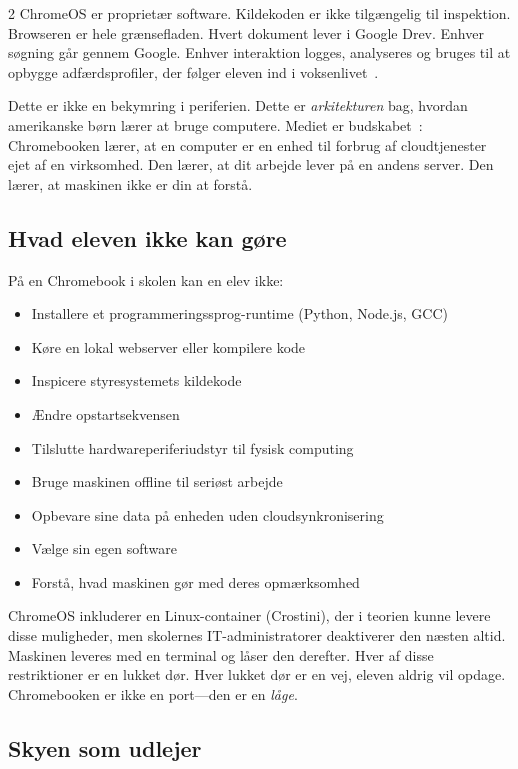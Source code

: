 \documentclass[11pt, a4paper]{article}
\begin{document}
\begin{multicols}{2}
ChromeOS er proprietær software. Kildekoden er ikke tilgængelig til inspektion. Browseren er hele grænsefladen. Hvert dokument lever i Google Drev. Enhver søgning går gennem Google. Enhver interaktion logges, analyseres og bruges til at opbygge adfærdsprofiler, der følger eleven ind i voksenlivet~\citep{zuboff2019surveillance}.

Dette er ikke en bekymring i periferien. Dette er \emph{arkitekturen} bag, hvordan amerikanske børn lærer at bruge computere. Mediet er budskabet~\citep{mcluhan1964understanding}: Chromebooken lærer, at en computer er en enhed til forbrug af cloudtjenester ejet af en virksomhed. Den lærer, at dit arbejde lever på en andens server. Den lærer, at maskinen ikke er din at forstå.

\subsection{Hvad eleven ikke kan gøre}

På en Chromebook i skolen kan en elev ikke:

\begin{itemize}
  \item Installere et programmeringssprog-runtime (Python, Node.js, GCC)
  \item Køre en lokal webserver eller kompilere kode
  \item Inspicere styresystemets kildekode
  \item Ændre opstartsekvensen
  \item Tilslutte hardwareperiferiudstyr til fysisk computing
  \item Bruge maskinen offline til seriøst arbejde
  \item Opbevare sine data på enheden uden cloudsynkronisering
  \item Vælge sin egen software
  \item Forstå, hvad maskinen gør med deres opmærksomhed
\end{itemize}

ChromeOS inkluderer en Linux-container (Crostini), der i teorien kunne levere disse muligheder, men skolernes IT-administratorer deaktiverer den næsten altid. Maskinen leveres med en terminal og låser den derefter. Hver af disse restriktioner er en lukket dør. Hver lukket dør er en vej, eleven aldrig vil opdage. Chromebooken er ikke en port---den er en \emph{låge}.

\subsection{Skyen som udlejer}


\end{multicols}
\end{document}
